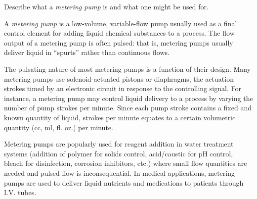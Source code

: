

Describe what a {\it metering pump} is and what one might be used for.













A {\it metering pump} is a low-volume, variable-flow pump usually used as a final control element for adding liquid chemical substances to a process.  The flow output of a metering pump is often pulsed: that is, metering pumps usually deliver liquid in ``spurts'' rather than continuous flows.
 
\vskip 10pt

The pulsating nature of most metering pumps is a function of their design.  Many metering pumps use solenoid-actuated pistons or diaphragms, the actuation strokes timed by an electronic circuit in response to the controlling signal.  For instance, a metering pump may control liquid delivery to a process by varying the number of pump strokes per minute.  Since each pump stroke contains a fixed and known quantity of liquid, strokes per minute equates to a certain volumetric quantity (cc, ml, fl. oz.) per minute.
 
Metering pumps are popularly used for reagent addition in water treatment systems (addition of polymer for solids control, acid/caustic for pH control, bleach for disinfection, corrosion inhibitors, etc.) where small flow quantities are needed and pulsed flow is inconsequential.  In medical applications, metering pumps are used to deliver liquid nutrients and medications to patients through I.V. tubes.




